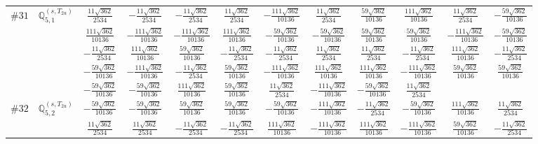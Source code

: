 \documentclass[fleqn,9pt,landscape]{jsarticle}
\begin{document}
\begin{center}
\begin{longtable}{lcccccccccc}
$ \#31\quad \mathbb{Q}_{5,1}^{(s,T_{2u})} $ & $ \frac{11 \sqrt{362}}{2534} $ & $ - \frac{11 \sqrt{362}}{2534} $ & $ - \frac{11 \sqrt{362}}{2534} $ & $ \frac{11 \sqrt{362}}{2534} $ & $ - \frac{111 \sqrt{362}}{10136} $ & $ \frac{11 \sqrt{362}}{2534} $ & $ \frac{59 \sqrt{362}}{10136} $ & $ \frac{111 \sqrt{362}}{10136} $ & $ \frac{11 \sqrt{362}}{2534} $ & $ - \frac{59 \sqrt{362}}{10136} $ \\
& $ \frac{111 \sqrt{362}}{10136} $ & $ - \frac{111 \sqrt{362}}{10136} $ & $ - \frac{111 \sqrt{362}}{10136} $ & $ \frac{111 \sqrt{362}}{10136} $ & $ - \frac{59 \sqrt{362}}{10136} $ & $ - \frac{59 \sqrt{362}}{10136} $ & $ \frac{59 \sqrt{362}}{10136} $ & $ \frac{59 \sqrt{362}}{10136} $ & $ - \frac{111 \sqrt{362}}{10136} $ & $ - \frac{59 \sqrt{362}}{10136} $ \\
& $ - \frac{11 \sqrt{362}}{2534} $ & $ \frac{111 \sqrt{362}}{10136} $ & $ \frac{59 \sqrt{362}}{10136} $ & $ - \frac{11 \sqrt{362}}{2534} $ & $ - \frac{11 \sqrt{362}}{2534} $ & $ \frac{11 \sqrt{362}}{2534} $ & $ \frac{11 \sqrt{362}}{2534} $ & $ - \frac{11 \sqrt{362}}{2534} $ & $ \frac{111 \sqrt{362}}{10136} $ & $ - \frac{11 \sqrt{362}}{2534} $ \\
& $ - \frac{59 \sqrt{362}}{10136} $ & $ - \frac{111 \sqrt{362}}{10136} $ & $ - \frac{11 \sqrt{362}}{2534} $ & $ \frac{59 \sqrt{362}}{10136} $ & $ - \frac{111 \sqrt{362}}{10136} $ & $ \frac{111 \sqrt{362}}{10136} $ & $ \frac{111 \sqrt{362}}{10136} $ & $ - \frac{111 \sqrt{362}}{10136} $ & $ \frac{59 \sqrt{362}}{10136} $ & $ \frac{59 \sqrt{362}}{10136} $ \\
& $ - \frac{59 \sqrt{362}}{10136} $ & $ - \frac{59 \sqrt{362}}{10136} $ & $ \frac{111 \sqrt{362}}{10136} $ & $ \frac{59 \sqrt{362}}{10136} $ & $ \frac{11 \sqrt{362}}{2534} $ & $ - \frac{111 \sqrt{362}}{10136} $ & $ - \frac{59 \sqrt{362}}{10136} $ & $ \frac{11 \sqrt{362}}{2534} $ & $  $ & $  $ \\ \hline
$ \#32\quad \mathbb{Q}_{5,2}^{(s,T_{2u})} $ & $ - \frac{59 \sqrt{362}}{10136} $ & $ - \frac{59 \sqrt{362}}{10136} $ & $ \frac{59 \sqrt{362}}{10136} $ & $ \frac{59 \sqrt{362}}{10136} $ & $ - \frac{59 \sqrt{362}}{10136} $ & $ - \frac{111 \sqrt{362}}{10136} $ & $ - \frac{11 \sqrt{362}}{2534} $ & $ - \frac{59 \sqrt{362}}{10136} $ & $ \frac{111 \sqrt{362}}{10136} $ & $ \frac{11 \sqrt{362}}{2534} $ \\
& $ \frac{11 \sqrt{362}}{2534} $ & $ \frac{11 \sqrt{362}}{2534} $ & $ - \frac{11 \sqrt{362}}{2534} $ & $ - \frac{11 \sqrt{362}}{2534} $ & $ \frac{111 \sqrt{362}}{10136} $ & $ - \frac{111 \sqrt{362}}{10136} $ & $ \frac{111 \sqrt{362}}{10136} $ & $ - \frac{111 \sqrt{362}}{10136} $ & $ \frac{59 \sqrt{362}}{10136} $ & $ - \frac{11 \sqrt{362}}{2534} $ \\

\end{longtable}
\end{center}
\end{document}
